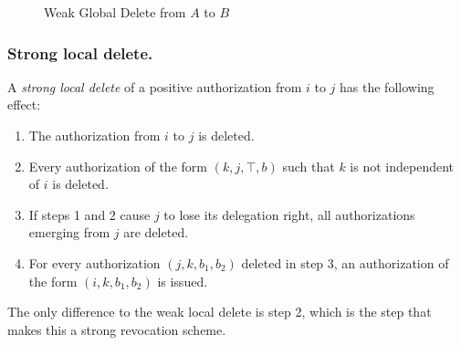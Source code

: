 \documentclass[runningheads]{llncs}
\begin{document}
\vspace{-3mm}
\begin{figure}[H]
\center
{}
\caption{Weak Global Delete from $A$ to $B$}
\end{figure}
\vspace{-7mm}

\subsubsection{Strong local delete.}
A \emph{strong local delete} of a positive authorization from $i$ to $j$ has the following effect:
\vspace{-1mm}
\begin{enumerate}
 \item The authorization from $i$ to $j$ is deleted.
 \item Every authorization of the form $(k,j,\top,b)$ such that $k$ is not independent of $i$ is deleted.
 \item If steps 1 and 2 cause $j$ to lose its delegation right, all authorizations emerging from $j$ are deleted.
 \item For every authorization $(j,k,b_1,b_2)$ deleted in step 3, an authorization of the form $(i,k,b_1,b_2)$ is issued.
\end{enumerate}
\vspace{-1mm}
The only difference to the weak local delete is step 2, which is the step that makes this a strong revocation scheme.
\end{document}
